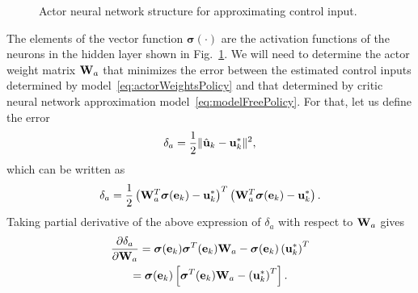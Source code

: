 \documentclass[conference]{IEEEtran}
\begin{document}
\begin{figure}
{\begin{adjustbox}{max width = 0.48\textwidth}
    \end{adjustbox}      
    }
  \caption{Actor neural network structure for approximating control input.}
  \label{fig:nnActor}
\end{figure}
%
The elements of the vector function $\bm{\sigma}(\cdot)$ are the activation functions of the neurons in the hidden layer shown in Fig.~\ref{fig:nnActor}. We will need to determine the actor weight matrix ${\bf W}_a$ that minimizes the error between the estimated control inputs determined by model~\eqref{eq:actorWeightsPolicy} and that determined by critic neural network approximation model~\eqref{eq:modelFreePolicy}. For that, let us define the error %
%
\begin{align}
  \label{eq:deltaActor}
  \delta_a = \frac{1}{2}\|\hat{{\bf u}}_k - {\bf u}_k^*\|^2,
\end{align}
%
which can be written as %
%
\begin{align*}
  \delta_a = \frac{1}{2}\left( {\bf W}_a^T\bm{\sigma}({\bf e}_k) -  {\bf u}_k^*\right)^T\left( {\bf W}_a^T\bm{\sigma}({\bf e}_k) -  {\bf u}_k^*\right). 
\end{align*}
%
Taking partial derivative of the above expression of $\delta_a$  with respect to ${\bf W}_a$ gives %
%
\begin{multline*}
  \frac{\partial \delta_a}{\partial{\bf W}_a} = \bm{\sigma}({\bf e}_k)\bm{\sigma}^T({\bf e}_k){\bf W}_a - \bm{\sigma}({\bf e}_k)\left( {\bf u}_k^* \right)^T\\
  =\bm{\sigma}({\bf e}_k)\left[ \bm{\sigma}^T({\bf e}_k){\bf W}_a -\left( {\bf u}_k^* \right)^T \right].
\end{multline*}
\end{document}
